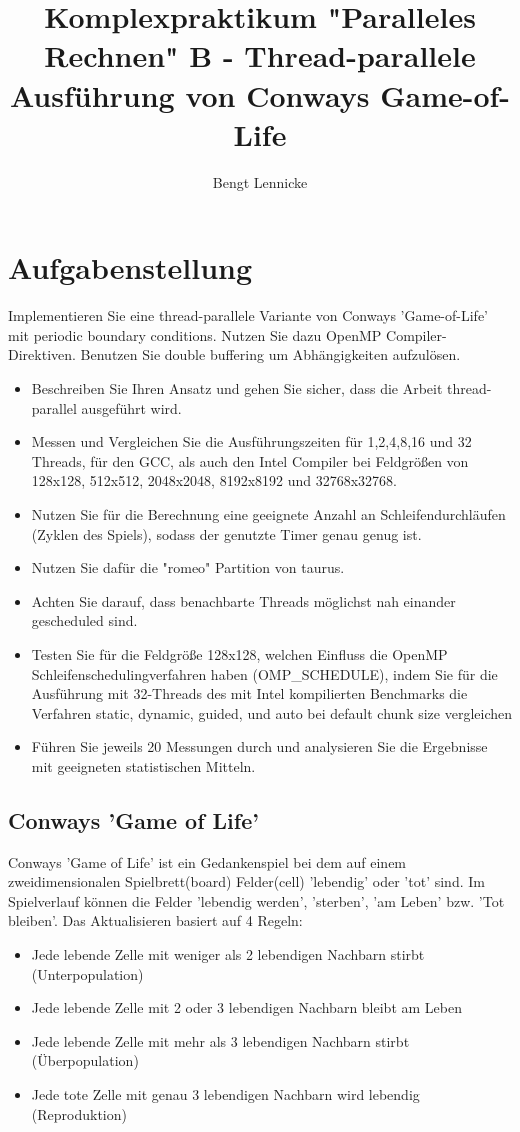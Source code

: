 \documentclass[plainarticle,zihtitle,german,final,hyperref,utf8]{zihpub}
\author{Bengt Lennicke}
\title{Komplexpraktikum "Paralleles Rechnen" \newline B - Thread-parallele Ausführung von Conways Game-of-Life}
\begin{document}
\section{Aufgabenstellung}
Implementieren Sie eine thread-parallele Variante von Conways 'Game-of-Life' mit periodic boundary conditions. Nutzen Sie dazu OpenMP Compiler-Direktiven. Benutzen Sie double buffering um Abhängigkeiten aufzulösen.

\begin{itemize}
	\item Beschreiben Sie Ihren Ansatz und gehen Sie sicher, dass die Arbeit thread-parallel ausgeführt wird.
	\item Messen und Vergleichen Sie die Ausführungszeiten für 1,2,4,8,16 und 32 Threads, für den GCC, als auch den Intel Compiler bei Feldgrößen von 128x128, 512x512, 2048x2048, 8192x8192 und 32768x32768.
	\item Nutzen Sie für die Berechnung eine geeignete Anzahl an Schleifendurchläufen (Zyklen des Spiels), sodass der genutzte Timer genau genug ist.
	\item Nutzen Sie dafür die "romeo" Partition von taurus.
	\item Achten Sie darauf, dass benachbarte Threads möglichst nah einander gescheduled sind.
	\item Testen Sie für die Feldgröße 128x128, welchen Einfluss die OpenMP Schleifenschedulingverfahren haben (OMP\_SCHEDULE), indem Sie für die Ausführung mit 32-Threads des mit Intel kompilierten Benchmarks die Verfahren static, dynamic, guided, und auto bei default chunk size vergleichen
	\item Führen Sie jeweils 20 Messungen durch und analysieren Sie die Ergebnisse mit geeigneten statistischen Mitteln.
\end{itemize}

\subsection{Conways 'Game of Life'}
Conways 'Game of Life' ist ein Gedankenspiel bei dem auf einem zweidimensionalen Spielbrett(board) Felder(cell) 'lebendig' oder 'tot' sind. Im Spielverlauf können die Felder 'lebendig werden', 'sterben', 'am Leben' bzw. 'Tot bleiben'. Das Aktualisieren basiert auf 4 Regeln:\cite{conwaysgame_wiki}
 
\begin{itemize}
	\item Jede lebende Zelle mit weniger als 2 lebendigen Nachbarn stirbt (Unterpopulation)
 	\item Jede lebende Zelle mit 2 oder 3 lebendigen Nachbarn bleibt am Leben
 	\item Jede lebende Zelle mit mehr als 3 lebendigen Nachbarn stirbt (Überpopulation)
 	\item Jede tote Zelle mit genau 3 lebendigen Nachbarn wird lebendig (Reproduktion)
\end{itemize}
\end{document}

